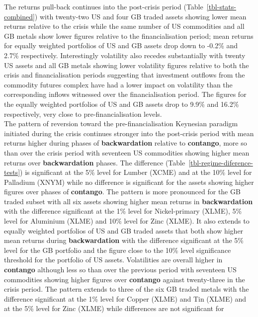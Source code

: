 \documentclass[
  authoryear,
  preprint,
  3p]{elsarticle}
\begin{document}
The returns pull-back continues into the post-crisis period
(Table~\ref{tbl-stats-combined}) with twenty-two US and four GB traded
assets showing lower mean returns relative to the crisis while the same
number of US commodities and all GB metals show lower figures relative
to the financialisation period; mean returns for equally weighted
portfolios of US and GB assets drop down to -0.2\% and 2.7\%
respectively. Interestingly volatility also recedes substantially with
twenty US assets and all GB metals showing lower volatility figures
relative to both the crisis and financialisation periods suggesting that
investment outflows from the commodity futures complex have had a lower
impact on volatility than the corresponding inflows witnessed over the
financialisation period. The figures for the equally weighted portfolios
of US and GB assets drop to 9.9\% and 16.2\% respectively, very close to
pre-financialisation levels.\\
The pattern of reversion toward the pre-financialisation Keynesian
paradigm initiated during the crisis continues stronger into the
post-crisis period with mean returns higher during phases of
\textbf{backwardation} relative to \textbf{contango}, more so than over
the crisis period with seventeen US commodities showing higher mean
returns over \textbf{backwardation} phases. The difference
(Table~\ref{tbl-regime-diference-tests}) is significant at the 5\% level
for Lumber (XCME) and at the 10\% level for Palladium (XNYM) while no
difference is significant for the assets showing higher figures over
phases of \textbf{contango}. The pattern is more pronounced for the GB
traded subset with all six assets showing higher mean returns in
\textbf{backwardation} with the difference significant at the 1\% level
for Nickel-primary (XLME), 5\% level for Aluminium (XLME) and 10\% level
for Zinc (XLME). It also extends to equally weighted portfolios of US
and GB traded assets that both show higher mean returns during
\textbf{backwardation} with the difference significant at the 5\% level
for the GB portfolio and the figure close to the 10\% level significance
threshold for the portfolio of US assets. Volatilities are overall
higher in \textbf{contango} although less so than over the previous
period with seventeen US commodities showing higher figures over
\textbf{contango} against twenty-three in the crisis period. The pattern
extends to three of the six GB traded metals with the difference
significant at the 1\% level for Copper (XLME) and Tin (XLME) and at the
5\% level for Zinc (XLME) while differences are not significant for
\end{document}
